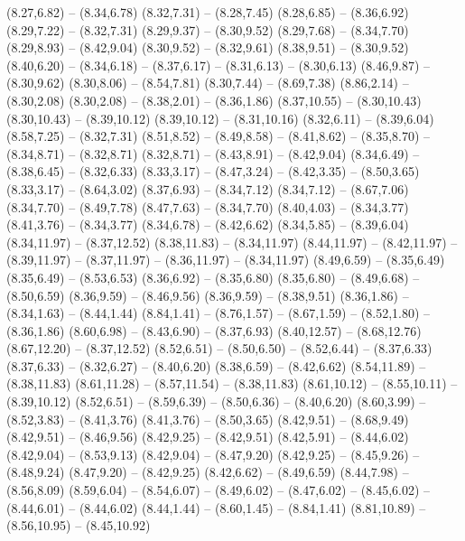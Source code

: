 {  (8.27,6.82) -- (8.34,6.78)
  (8.32,7.31) -- (8.28,7.45)
  (8.28,6.85) -- (8.36,6.92)
  (8.29,7.22) -- (8.32,7.31)
  (8.29,9.37) -- (8.30,9.52)
  (8.29,7.68) -- (8.34,7.70)
  (8.29,8.93) -- (8.42,9.04)
  (8.30,9.52) -- (8.32,9.61)
  (8.38,9.51) -- (8.30,9.52)
  (8.40,6.20) -- (8.34,6.18) -- (8.37,6.17) -- (8.31,6.13) -- (8.30,6.13)
  (8.46,9.87) -- (8.30,9.62)
  (8.30,8.06) -- (8.54,7.81)
  (8.30,7.44) -- (8.69,7.38)
  (8.86,2.14) -- (8.30,2.08)
  (8.30,2.08) -- (8.38,2.01) -- (8.36,1.86)
  (8.37,10.55) -- (8.30,10.43)
  (8.30,10.43) -- (8.39,10.12)
  (8.39,10.12) -- (8.31,10.16)
  (8.32,6.11) -- (8.39,6.04)
  (8.58,7.25) -- (8.32,7.31)
  (8.51,8.52) -- (8.49,8.58) -- (8.41,8.62) -- (8.35,8.70) -- (8.34,8.71) -- (8.32,8.71)
  (8.32,8.71) -- (8.43,8.91) -- (8.42,9.04)
  (8.34,6.49) -- (8.38,6.45) -- (8.32,6.33)
  (8.33,3.17) -- (8.47,3.24) -- (8.42,3.35) -- (8.50,3.65)
  (8.33,3.17) -- (8.64,3.02)
  (8.37,6.93) -- (8.34,7.12)
  (8.34,7.12) -- (8.67,7.06)
  (8.34,7.70) -- (8.49,7.78)
  (8.47,7.63) -- (8.34,7.70)
  (8.40,4.03) -- (8.34,3.77)
  (8.41,3.76) -- (8.34,3.77)
  (8.34,6.78) -- (8.42,6.62)
  (8.34,5.85) -- (8.39,6.04)
  (8.34,11.97) -- (8.37,12.52)
  (8.38,11.83) -- (8.34,11.97)
  (8.44,11.97) -- (8.42,11.97) -- (8.39,11.97) -- (8.37,11.97) -- (8.36,11.97) -- (8.34,11.97)
  (8.49,6.59) -- (8.35,6.49)
  (8.35,6.49) -- (8.53,6.53)
  (8.36,6.92) -- (8.35,6.80)
  (8.35,6.80) -- (8.49,6.68) -- (8.50,6.59)
  (8.36,9.59) -- (8.46,9.56)
  (8.36,9.59) -- (8.38,9.51)
  (8.36,1.86) -- (8.34,1.63) -- (8.44,1.44)
  (8.84,1.41) -- (8.76,1.57) -- (8.67,1.59) -- (8.52,1.80) -- (8.36,1.86)
  (8.60,6.98) -- (8.43,6.90) -- (8.37,6.93)
  (8.40,12.57) -- (8.68,12.76)
  (8.67,12.20) -- (8.37,12.52)
  (8.52,6.51) -- (8.50,6.50) -- (8.52,6.44) -- (8.37,6.33)
  (8.37,6.33) -- (8.32,6.27) -- (8.40,6.20)
  (8.38,6.59) -- (8.42,6.62)
  (8.54,11.89) -- (8.38,11.83)
  (8.61,11.28) -- (8.57,11.54) -- (8.38,11.83)
  (8.61,10.12) -- (8.55,10.11) -- (8.39,10.12)
  (8.52,6.51) -- (8.59,6.39) -- (8.50,6.36) -- (8.40,6.20)
  (8.60,3.99) -- (8.52,3.83) -- (8.41,3.76)
  (8.41,3.76) -- (8.50,3.65)
  (8.42,9.51) -- (8.68,9.49)
  (8.42,9.51) -- (8.46,9.56)
  (8.42,9.25) -- (8.42,9.51)
  (8.42,5.91) -- (8.44,6.02)
  (8.42,9.04) -- (8.53,9.13)
  (8.42,9.04) -- (8.47,9.20)
  (8.42,9.25) -- (8.45,9.26) -- (8.48,9.24)
  (8.47,9.20) -- (8.42,9.25)
  (8.42,6.62) -- (8.49,6.59)
  (8.44,7.98) -- (8.56,8.09)
  (8.59,6.04) -- (8.54,6.07) -- (8.49,6.02) -- (8.47,6.02) -- (8.45,6.02) -- (8.44,6.01) -- (8.44,6.02)
  (8.44,1.44) -- (8.60,1.45) -- (8.84,1.41)
  (8.81,10.89) -- (8.56,10.95) -- (8.45,10.92)
}
